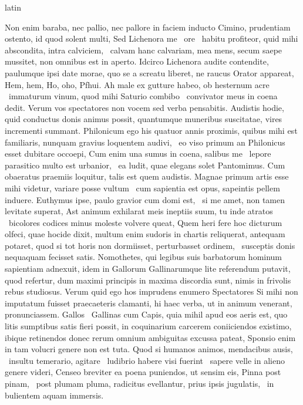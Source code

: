 \documentclass[12pt]{book}
\renewenvironment{latin}
    	{\begin{hyphenrules}{latin}}
    	{\end{hyphenrules}}
\begin{document}
\begin{pages}
\begin{latin}
\begin{Leftside}
                    Non enim baraba, nec pallio, nec pallore in faciem inducto Cimino, prudentiam ostento, id quod solent multi, Sed Lichenora me ﻿\ampersand\ ore ﻿\ampersand\ habitu profiteor, quid mihi abscondita, intra calviciem, ﻿\ampersand\ calvam hanc calvariam, mea mens, secum saepe mussitet, non omnibus est in aperto. 
                    Idcirco Lichenora audite contendite, paulumque ipsi date morae, quo se a screatu liberet, ne raucus Orator appareat, Hem, hem, Ho, oho, Pfhui. 
                    Ah male ex gutture habeo, ob hesternum acre ﻿\ampersand\ immaturum vinum, quod mihi Saturio combibo ﻿\ampersand\ convivator meus in coena dedit. 
                    Verum vos spectatores non vocem sed verba pensabitis. 
                    Audistis hodie, quid conductus donis animus possit, quantumque muneribus suscitatae, vires incrementi summant. 
                    Philonicum ego his quatuor annis proximis, quibus mihi est familiaris, nunquam gravius loquentem audivi, ﻿\ampersand\ eo viso primum an Philonicus esset dubitare occoepi, Cum enim una sumus in coena, salibus me ﻿\ampersand\ lepore parasitico multo est urbanior, ﻿\ampersand\ ea ludit, quae elegans solet Pantomimus. 
                    Cum obaeratus praemiis loquitur, talis est quem audistis.  
                     Magnae primum artis esse mihi videtur, variare posse vultum ﻿\ampersand\, cum sapientia est opus, sapeintis pellem induere. 
                    Euthymus ipse, paulo gravior cum domi est, ﻿\ampersand\ si me amet, non tamen levitate superat, Ast animum exhilarat meis ineptiis suum, tu inde atratos ﻿\ampersand\ bicolores codices minus moleste volvere queat, Quem heri fere hoc dicturum olfeci, quae hocide dixit, multum enim sudoris in chartis reliquerat, antequam potaret, quod si tot horis non dormiisset, perturbasset ordinem, ﻿\ampersand\ susceptis donis nequaquam fecisset satis. 
                    Nomothetes, qui legibus suis barbatorum hominum sapientiam adnexuit, idem in Gallorum Gallinarumque lite referendum putavit, quod refertur, dum maximi principis in maxima discordia sunt, nimis in frivolis rebus studiosus. 
                    Verum quid ego hos imprudens enumero Spectatores Si mihi non imputatum fuisset praecaeteris clamanti, hi haec verba, ut in animum venerant, pronunciassem. Gallos ﻿\ampersand\ Gallinas cum Capis, quia mihil apud eos aeris est, quo litis sumptibus satis fieri possit, in coquinarium carcerem coniiciendos existimo, ibique retinendos donec rerum omnium ambiguitas excussa pateat, Sponsio enim in tam volucri genere non est tuta. 
                    Quod si humanos animos, mendacibus ausis, ﻿\ampersand\ insultu temerario, agitare ﻿\ampersand\ ludibrio habere visi fuerint ﻿\ampersand\ sapere velle in alieno genere videri, Censeo breviter ea poena puniendos, ut sensim eis, Pinna post pinam, ﻿\ampersand\ post plumam pluma, radicitus evellantur, prius ipsis jugulatis, ﻿\ampersand\ in bulientem aquam immersis. 

\end{Leftside}
\end{latin}
\end{pages}
\end{document}
